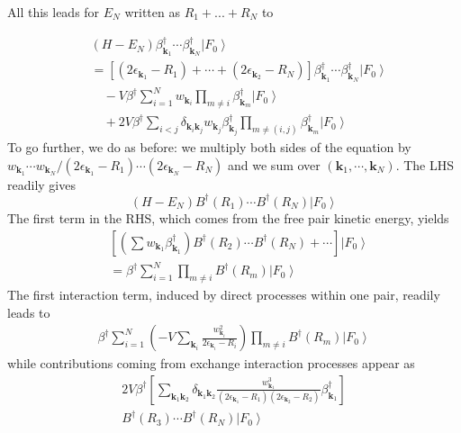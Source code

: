 \documentclass[epj]{svjour}
\newcommand{\vk}{\ensuremath{\mathbf{k}}}
\begin{document}
All this leads for $E_N$ written as $R_1+...+R_N$ to


\begin{equation}\label{eq:HN2}
\begin{split}
&(H-E_N)\beta^{\dagger}_{\mathbf{k} _1}\cdots\beta^{\dagger}_{\mathbf{k}
_N}\left|F_0\right> \\
&=[(2\epsilon_{\vk_1}-R_1)+\cdots+(2\epsilon_{\vk_2}-R_N)]\beta^\dagger_{\vk_1}\cdots\beta^\dagger_{\vk_N}\left|F_0\right>  \\
&\quad-V\beta^{\dagger}\sum^N_{i=1}w_{\mathbf{k}_i}\prod_{m\neq{}i}\beta^{\dagger}_{\mathbf{k} _m} \left|F_0\right>  \\
&\quad+2V\beta^\dagger\sum_{i<j}\delta_{\vk_i\vk_j}w_{\vk_j}\beta^\dagger_{\vk_j}\prod_{m\neq(i,j)}\beta^{\dagger}_{\mathbf{k} _m} \left|F_0\right>  
\end{split}
\end{equation}
To go further, we do as before: we multiply both sides of the equation by $w_{\vk_1}\cdots{}w_{\vk_N}/(2\epsilon_{\vk_1}-R_1)\cdots(2\epsilon_{\vk_N}-R_N)$ and we sum over $(\vk_1,\cdots,\vk_N)$.  
The LHS readily gives
\begin{equation}
(H-E _N)B^{\dagger} (R_1)\cdots{}B^{\dagger}(R_N)\left|F_0\right> 
\end{equation}
The first term in the RHS, which comes from the free pair kinetic energy, yields
\begin{equation}
\begin{split}
&[(\sum{}w_{\vk_1}\beta^\dagger_{\vk_1})B^\dagger(R_2)\cdots{}B^\dagger(R_N)+\cdots]\left|F_0\right>\\
&=\beta^\dagger\sum_{i=1}^N\prod_{m\neq{i}}B^\dagger(R_m)\left|F_0\right> 
\end{split}
\end{equation}
The first interaction term, induced by direct processes within one pair, readily leads to 
\begin{equation}
\begin{split}
\beta^\dagger\sum_{i=1}^N(-V\sum_{\vk_i}\frac{w_{\mathbf{k} _i}^2}{2\epsilon_{\mathbf{k} _i}-R_i})\prod_{m\neq{i}}B^\dagger(R_m)\left|F_0\right> 
\end{split}
\end{equation}
while contributions coming from exchange interaction processes appear as
\begin{equation}
\begin{split}
2V\beta^\dagger\left[\sum_{\vk_1\vk_2}\delta_{\vk_1\vk_2}\frac{w^3_{\mathbf{k} _1}}{(2\epsilon_{\mathbf{k} _1}-R_1)(2\epsilon_{\mathbf{k} _2}-R_2)}\beta^\dagger_{\vk_1}\right]\\B^\dagger(R_3)\cdots{}B^\dagger(R_N)\left|F_0\right> 
\end{split}
\end{equation}
\end{document}
